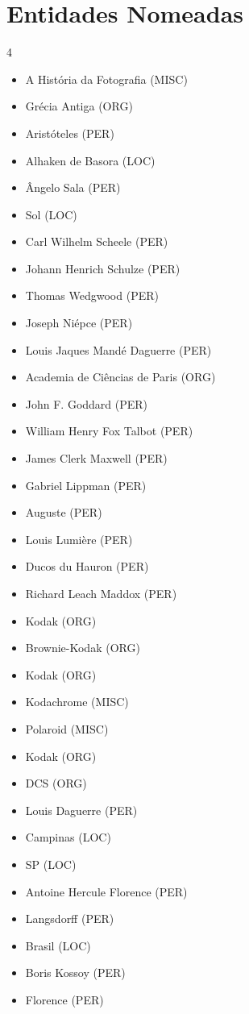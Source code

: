 \documentclass{article}
\begin{document}
\section*{Entidades Nomeadas}
\begin{multicols}{4}
\begin{itemize}
\item A História da Fotografia (MISC)
\item Grécia Antiga (ORG)
\item Aristóteles (PER)
\item Alhaken de Basora (LOC)
\item Ângelo Sala (PER)
\item Sol (LOC)
\item Carl Wilhelm Scheele (PER)
\item Johann Henrich Schulze (PER)
\item Thomas Wedgwood (PER)
\item Joseph Niépce (PER)
\item Louis Jaques Mandé Daguerre (PER)
\item Academia de Ciências de Paris (ORG)
\item John F. Goddard (PER)
\item William Henry Fox Talbot (PER)
\item James Clerk Maxwell (PER)
\item Gabriel Lippman (PER)
\item Auguste (PER)
\item Louis Lumière (PER)
\item Ducos du Hauron (PER)
\item Richard Leach Maddox (PER)
\item Kodak (ORG)
\item Brownie-Kodak (ORG)
\item Kodak (ORG)
\item Kodachrome (MISC)
\item Polaroid (MISC)
\item Kodak (ORG)
\item DCS (ORG)
\item Louis Daguerre (PER)
\item Campinas (LOC)
\item SP (LOC)
\item Antoine Hercule Florence (PER)
\item Langsdorff (PER)
\item Brasil (LOC)
\item Boris Kossoy (PER)
\item Florence (PER)

\end{itemize}
\end{multicols}
\end{document}

